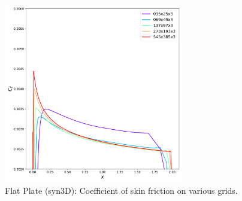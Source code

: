 \begin{figure}[ht!]
\centering
  \includegraphics[width=0.7\textwidth]{figs/flat/skin_friction_grid.pdf}
  \caption{Flat Plate (syn3D): Coefficient of skin friction on various grids.}
  \label{fig:synflatcfstudy}
\end{figure}

